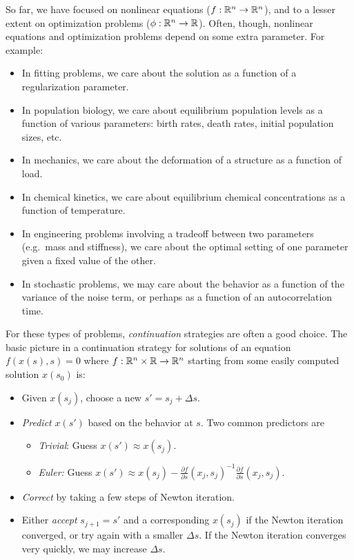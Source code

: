 \documentclass[12pt, leqno]{article} %
\begin{document}
So far, we have focused on
nonlinear equations ($f : \mathbb{R}^n \rightarrow \mathbb{R}^n$),
and to a lesser extent on
optimization problems ($\phi : \mathbb{R}^n \rightarrow \mathbb{R}$).
Often, though, nonlinear equations and optimization problems
depend on some extra parameter.  For example:
\begin{itemize}
\item
  In fitting problems, we care about the solution as a function
  of a regularization parameter.
\item
  In population biology, we care about equilibrium population levels
  as a function of various parameters: birth rates, death rates,
  initial population sizes, etc.
\item
  In mechanics, we care about the deformation of a structure
  as a function of load.
\item
  In chemical kinetics, we care about equilibrium chemical
  concentrations as a function of temperature.
\item
  In engineering problems involving a tradeoff between two parameters
  (e.g.~mass and stiffness), we care about the optimal setting of one
  parameter given a fixed value of the other.
\item
  In stochastic problems, we may care about the behavior as a function of
  the variance of the noise term, or perhaps as a function of an
  autocorrelation time.
\end{itemize}
For these types of problems, {\em continuation} strategies are often
a good choice.  The basic picture in a continuation strategy for
solutions of an equation $f(x(s),s) = 0$ where
$f : \mathbb{R}^n \times \mathbb{R} \rightarrow \mathbb{R}^n$
starting from some easily computed solution $x(s_0)$ is:
\begin{itemize}
\item
  Given $x(s_j)$, choose a new $s' = s_j + \Delta s$.
\item
  {\em Predict} $x(s')$ based on the behavior at $s$.  Two common
  predictors are
  \begin{itemize}
  \item {\em Trivial}: Guess $x(s') \approx x(s_j)$.
  \item {\em Euler:} Guess
    $x(s') \approx x(s_j) - \frac{\partial f}{\partial s}(x_j,s_j)^{-1} \frac{\partial f}{\partial s}(x_j,s_j)$.
  \end{itemize}
\item
  {\em Correct} by taking a few steps of Newton iteration.
\item
  Either {\em accept} $s_{j+1} = s'$ and a corresponding $x(s_j)$ if
  the Newton iteration converged, or try again with a smaller $\Delta
  s$.  If the Newton iteration converges very quickly, we may
  increase $\Delta s$.
\end{itemize}
\end{document}
